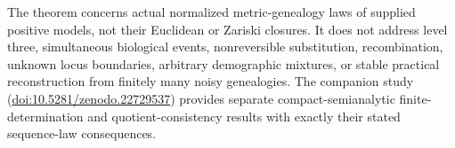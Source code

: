 \documentclass[11pt]{article}
\begin{document}
The theorem concerns actual normalized metric-genealogy laws of supplied positive models, not their Euclidean or Zariski closures. It does not address level three, simultaneous biological events, nonreversible substitution, recombination, unknown locus boundaries, arbitrary demographic mixtures, or stable practical reconstruction from finitely many noisy genealogies. The companion study (\href{https://doi.org/10.5281/zenodo.22729537}{doi:10.5281/zenodo.22729537}) provides separate compact-semianalytic finite-determination and quotient-consistency results with exactly their stated sequence-law consequences.
\end{document}
